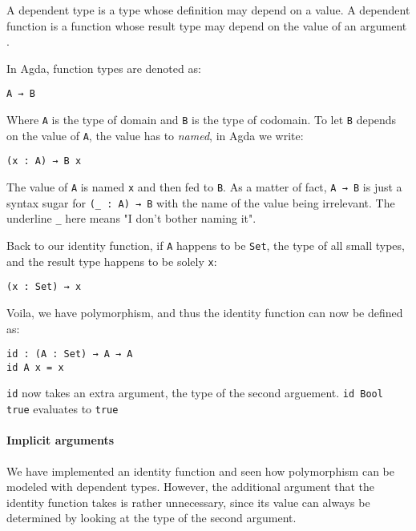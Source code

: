 \documentclass[../thesis.tex]{subfiles}
\begin{document}
A dependent type is a type whose definition may depend on a value. A dependent
function is a function whose result type  may depend on the value of an argument .

In Agda, function types are denoted as:

\begin{lstlisting}
A → B
\end{lstlisting}

Where {\lstinline|A|} is the type of domain and {\lstinline|B|} is the type of
codomain. To let {\lstinline|B|} depends on the value of {\lstinline|A|}, the
value has to \textit{named}, in Agda we write:

\begin{lstlisting}
(x : A) → B x
\end{lstlisting}

The value of {\lstinline|A|} is named {\lstinline|x|} and then fed to {\lstinline|B|}.
As a matter of fact, {\lstinline|A → B|} is just a syntax sugar for {\lstinline|(_ : A) → B|}
with the name of the value being irrelevant. The underline {\lstinline|_|} here
means "I don't bother naming it".

Back to our identity function, if {\lstinline|A|} happens to be {\lstinline|Set|},
the type of all small types, and the result type happens to be solely {\lstinline|x|}:

\begin{lstlisting}
(x : Set) → x
\end{lstlisting}

Voila, we have polymorphism, and thus the identity function can now be defined as:

\begin{lstlisting}
id : (A : Set) → A → A
id A x = x
\end{lstlisting}

{\lstinline|id|} now takes an extra argument, the type of the second arguement.
{\lstinline|id Bool true|} evaluates to {\lstinline|true|}

\paragraph{Implicit arguments}

We have implemented an identity function and seen how polymorphism can be modeled
with dependent types. However, the additional argument that the identity function
takes is rather unnecessary, since its value can always be determined by looking
at the type of the second argument.
\end{document}
